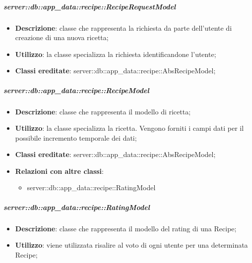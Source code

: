 		\subparagraph{server::db::app\_data::recipe::RecipeRequestModel} %
		\label{subp:server_db_app_data_recipe_reciperequestmodel}
			\begin{itemize}
				\item \textbf{Descrizione}: classe che rappresenta la richiesta da parte dell'utente di creazione di una nuova ricetta;
				\item \textbf{Utilizzo}: la classe specializza la richiesta identificandone l'utente;
				\item \textbf{Classi ereditate}: server::db::app\_data::recipe::AbsRecipeModel;
			\end{itemize}


		\subparagraph{server::db::app\_data::recipe::RecipeModel} %
		\label{subp:server_db_app_data_recipe_recipemodel}
			\begin{itemize}
				\item \textbf{Descrizione}: classe che rappresenta il modello di ricetta;
				\item \textbf{Utilizzo}: la classe specializza la ricetta. Vengono forniti i campi dati per il possibile incremento temporale dei dati;
				\item \textbf{Classi ereditate}: server::db::app\_data::recipe::AbsRecipeModel;
				\item \textbf{Relazioni con altre classi}:
					\begin{itemize}
						\item server::db::app\_data::recipe::RatingModel
					\end{itemize}
			\end{itemize}

		\subparagraph{server::db::app\_data::recipe::RatingModel} %
		\label{subp:server_db_app_data_recipe_recipemodel}
			\begin{itemize}
				\item \textbf{Descrizione}: classe che rappresenta il modello del rating di una Recipe;
				\item \textbf{Utilizzo}: viene utilizzata risalire al voto di ogni utente per una determinata Recipe;
			\end{itemize}


